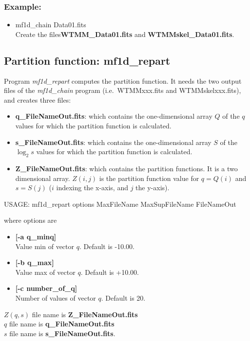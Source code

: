 \subsubsection*{Example:}
\begin{itemize}
\item mf1d\_chain Data01.fits \\
 Create the files{\bf WTMM\_Data01.fits} and {\bf WTMMskel\_Data01.fits}.
\end{itemize}

\subsection{Partition function: mf1d\_repart}
Program {\em mf1d\_repart} computes the partition function. It needs the two
output files of the {\em mf1d\_chain} program (i.e.\ WTMMxxx.fits 
and WTMMskelxxx.fits), and creates three files:
\begin{itemize}
\item {\bf q\_FileNameOut.fits}: which contains the one-dimensional array $Q$ 
of the $q$ values for which the
partition function is calculated.
\item {\bf s\_FileNameOut.fits}: which contains the one-dimensional array $S$
of the $\log_2 s$ values for which the
partition function is calculated.
\item {\bf Z\_FileNameOut.fits}: which contains the partition functions. It
is a two dimensional array. $Z(i,j)$ is the partition function value 
 for $q = Q(i)$ and $s = S(j)$ ($i$ indexing the x-axis, and $j$ the y-axis).
\end{itemize}
{\bf
\begin{center}
USAGE: mf1d\_repart options MaxFileName MaxSupFileName FileNameOut
\end{center}}
where options are 
\begin{itemize}
\item {\bf [-a q\_minq]} \\
Value min of vector $q$. Default is -10.00.
\item {\bf [-b q\_max]} \\
Value max of vector $q$. Default is +10.00.
\item {\bf [-c number\_of\_q]} \\
Number of values of vector $q$. Default is 20.
\end{itemize}
$Z(q,s)$ file name is {\bf Z\_FileNameOut.fits} \\
$q$ file name is {\bf q\_FileNameOut.fits} \\
$s$ file name is {\bf s\_FileNameOut.fits}. \\
